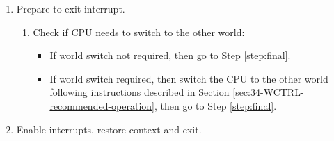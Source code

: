 \documentclass[main\_\_EN.tex]{subfiles}
\begin{document}
\begin{enumerate}
\begin{itemize}
                \item 0\verb+~+31: indicates the CPU returns to another interrupt monitored at Entry ,
                \begin{itemize}
                    \item Update the world switch register of Entry :
                        \begin{itemize}
                            \item Update Field \hyperref[fielddesc:WCLCORE0CURRENT0]{WCL\_CORE\_0\_CURRENT\_} to 0, indicating the CPU is no longer at the interrupt monitored at Entry .
                            \item Fields \hyperref[fielddesc:WCLCORE0FROMWORLD0]{WCL\_CORE\_0\_FROM\_WORLD\_} and \hyperref[fielddesc:WCLCORE0FROMENTRY0]{WCL\_CORE\_0\_FROM\_ENTRY\_} stay the same.
                        \end{itemize}
                    \item Update the  world switch register of Entry :
                        \begin{itemize}
                            \item Update Field  \hyperref[fielddesc:WCLCORE0CURRENT0]{WCL\_CORE\_0\_CURRENT\_} to 1, indicating the CPU will return to Entry .
                        \end{itemize}
                     \end{itemize}
            \end{itemize}
        \item Prepare to exit interrupt.\label{step:last-step}
            \begin{enumerate}
                \item Check if CPU needs to switch to the other world:
                    \begin{itemize}
                        \item If world switch not required, then go to Step \ref{step:final}.
                        \item If world switch required, then switch the CPU to the other world following instructions described in Section \ref{sec:34-WCTRL-recommended-operation}, then go to Step \ref{step:final}.
                    \end{itemize}
            \end{enumerate}
        \item Enable interrupts, restore context and exit. \label{step:final}
\end{enumerate}
\end{document}
